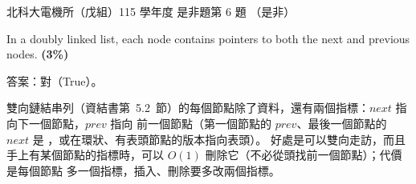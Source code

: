 \begin{pastexam}[label={px:ntut-115-ee-ds-06}]{北科大電機所（戊組）115 學年度 是非題第 6 題}
（是非）

In a doubly linked list, each node contains pointers to both the next and previous nodes.
\textbf{(3\%)}
\end{pastexam}

\begin{pastsoln}
答案：對（True）。

雙向鏈結串列（資結書第~5.2~節）的每個節點除了資料，還有兩個指標：$\mathit{next}$ 指向下一個節點，$\mathit{prev}$ 指向
前一個節點（第一個節點的 $\mathit{prev}$、最後一個節點的 $\mathit{next}$ 是 \NIL，或在環狀、有表頭節點的版本指向表頭）。
好處是可以雙向走訪，而且手上有某個節點的指標時，可以 $O(1)$ 刪除它（不必從頭找前一個節點）；代價是每個節點
多一個指標，插入、刪除要多改兩個指標。
\end{pastsoln}
